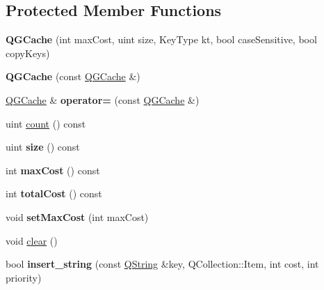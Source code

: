 \subsection*{Protected Member Functions}
\begin{DoxyCompactItemize}
\item 
\mbox{\label{class_q_g_cache_a993236be98f96a207a872b3990db0be7}} 
{\bfseries Q\+G\+Cache} (int max\+Cost, uint size, Key\+Type kt, bool case\+Sensitive, bool copy\+Keys)
\item 
\mbox{\label{class_q_g_cache_ac99ee21a13fa085b60012717c3bfd3e4}} 
{\bfseries Q\+G\+Cache} (const \mbox{\hyperlink{class_q_g_cache}{Q\+G\+Cache}} \&)
\item 
\mbox{\label{class_q_g_cache_aa58dc5bf77c3846e89cc46f0124bc6fc}} 
\mbox{\hyperlink{class_q_g_cache}{Q\+G\+Cache}} \& {\bfseries operator=} (const \mbox{\hyperlink{class_q_g_cache}{Q\+G\+Cache}} \&)
\item 
uint \mbox{\hyperlink{class_q_g_cache_a8da4537fdfd7eca8e1ae092775e5538d}{count}} () const
\item 
\mbox{\label{class_q_g_cache_aa371b601ca93a8dd7c7d6728845e2073}} 
uint {\bfseries size} () const
\item 
\mbox{\label{class_q_g_cache_a5b3c7491d78e54203fb1b4bde26aaf04}} 
int {\bfseries max\+Cost} () const
\item 
\mbox{\label{class_q_g_cache_adb8125f1761226863fb71c1c8229cbf1}} 
int {\bfseries total\+Cost} () const
\item 
\mbox{\label{class_q_g_cache_ac168417e27bd435675361b710692e7a8}} 
void {\bfseries set\+Max\+Cost} (int max\+Cost)
\item 
void \mbox{\hyperlink{class_q_g_cache_a3e0d8ce359e64a8793ef7f9d79dc546b}{clear}} ()
\item 
\mbox{\label{class_q_g_cache_a115d46416492c26746ed3f1e6b4ae9f6}} 
bool {\bfseries insert\+\_\+string} (const \mbox{\hyperlink{class_q_string}{Q\+String}} \&key, Q\+Collection\+::\+Item, int cost, int priority)
\item 

\end{DoxyCompactItemize}
